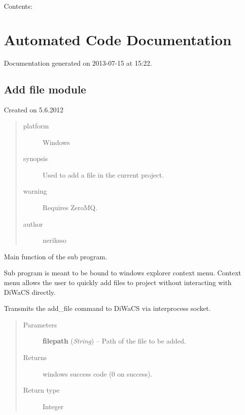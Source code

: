 \documentclass[letterpaper,10pt,english]{sphinxmanual}
\begin{document}
Contents:


\chapter{Automated Code Documentation}
\label{api:automated-code-documentation}\label{api::doc}\label{api:welcome-to-diwacs-documentation}
Documentation generated on 2013-07-15 at 15:22.


\section{Add file module}
\label{add_file:module-add_file}\label{add_file:add-file-module}\label{add_file::doc}
Created on 5.6.2012
\begin{quote}\begin{description}
\item[{platform}] \leavevmode
Windows

\item[{synopsis}] \leavevmode
Used to add a file in the current project.

\item[{warning}] \leavevmode
Requires ZeroMQ.

\item[{author}] \leavevmode
neriksso

\end{description}\end{quote}

\begin{fulllineitems}
\label{add_file:add_file.main}
Main function of the sub program.

Sub program is meant to be bound to windows explorer context menu.
Context menu allows the user to quickly add files to project without
interacting with DiWaCS directly.

Transmits the add\_file command to DiWaCS via interprocess socket.
\begin{quote}\begin{description}
\item[{Parameters}] \leavevmode
\textbf{filepath} (\emph{String}) -- Path of the file to be added.

\item[{Returns}] \leavevmode
windows success code (0 on success).

\item[{Return type}] \leavevmode
Integer

\end{description}\end{quote}

\end{fulllineitems}
\end{document}
